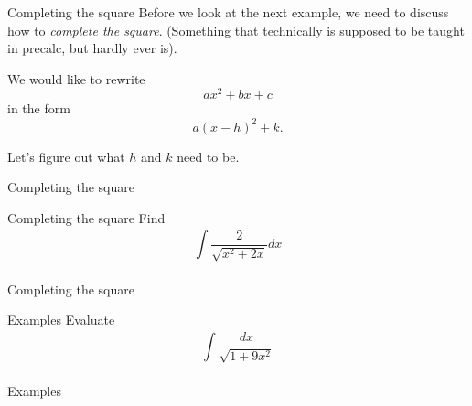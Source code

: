 \documentclass[presentation]{beamer}
\begin{document}
\begin{frame}[label={sec:org24c84a5}]{Completing the square}
Before we look at the next example, we need to discuss how to
\emph{complete the square}. (Something that technically is supposed to be
taught in precalc, but hardly ever is).

We would like to rewrite
\[ax^2 + bx + c \]
in the form
\[ a\left( x-h \right)^2 + k. \]

Let's figure out what \(h\) and \(k\) need to be.
\vspace{10in}
\end{frame}

\begin{frame}[label={sec:org04a28e6}]{Completing the square}
\end{frame}

\begin{frame}[label={sec:org5d35e0d}]{Completing the square}
Find
\[
\int\limits_{}^{} \frac{2}{\sqrt{x^2+2x}}dx \]
\vspace{10in}
\end{frame}

\begin{frame}[label={sec:org392d168}]{Completing the square}
\end{frame}

\begin{frame}[label={sec:org3ffc0a0}]{Examples}
Evaluate
\[
\int\limits_{}^{}\frac{dx}{\sqrt{1+9x^2}} \]
\vspace{10in}
\end{frame}

\begin{frame}[label={sec:org98b940a}]{Examples}
\end{frame}
\end{document}
